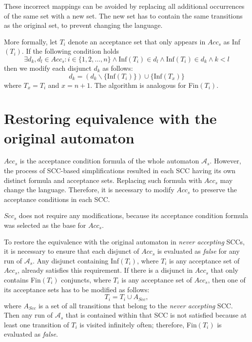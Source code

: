 \documentclass[
  digital, %
  twoside, %
  table,   %
  lof,     %
  lot,     %
]{fithesis3}
\begin{document}
These incorrect mappings can be avoided by replacing all additional occurrences of the same set with a new set. The new set has to contain the same transitions as the original set, to prevent changing the language. 

More formally, let $T_i$ denote an acceptance set that only appears in $Acc_s$ as Inf$(T_i)$. If the following condition holds
\begin{equation*}
  \exists d_k, d_l \in Acc_s \colon i \in \{1, 2, \dots, n\} \wedge \text{Inf}(T_i) \in d_l \wedge \text{Inf}(T_i) \in d_k \wedge k < l
\end{equation*}
then we modify each disjunct $d_k$ as follows:
\begin{equation*}
  d_k = (d_k \smallsetminus \{\text{Inf}(T_i)\}) \cup \{\text{Inf}(T_x)\}
\end{equation*}
where $T_x = T_i$ and $x = n + 1$. The algorithm is analogous for Fin$(T_i)$.

\section{Restoring equivalence with the original automaton}
\label{sec:restore_equiv}
$Acc_s$ is the acceptance condition formula of the whole automaton $\mathcal{A}_s$. However, the process of SCC-based simplifications resulted in each SCC  having its own distinct formula and acceptance sets. Replacing such formula with $Acc_s$ may change the language. Therefore, it is necessary to modify $Acc_s$ to preserve the acceptance conditions in each SCC. 

$Scc_s$ does not require any modifications, because its acceptance condition formula was selected as the base for $Acc_s$.

To restore the equivalence with the original automaton in \emph{never accepting} SCCs, it is necessary to ensure that each disjunct of $Acc_s$ is evaluated as \emph{false} for any run of $\mathcal{A}_s$. Any disjunct containing Inf$(T_i)$, where $T_i$ is any acceptance set of $Acc_s$, already satisfies this requirement. If there is a disjunct in $Acc_s$ that only contains Fin$(T_i)$ conjuncts, where $T_i$ is any acceptance set of $Acc_s$, then one of its acceptance sets has to be modified as follows:
\begin{equation*}
  T_i = T_i \cup A_{Scc},
\end{equation*}
where $A_{Scc}$ is a set of all transitions that belong to the \emph{never accepting} SCC. Then any run of $\mathcal{A}_s$ that is contained within that SCC is not satisfied because at least one transition of $T_i$ is visited infinitely often; therefore, Fin$(T_i)$ is evaluated as \emph{false}.
\end{document}
